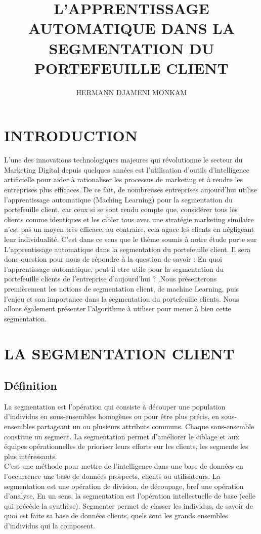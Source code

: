 \documentclass{article}
\title{L'APPRENTISSAGE AUTOMATIQUE DANS LA SEGMENTATION DU PORTEFEUILLE CLIENT}
\author{HERMANN DJAMENI MONKAM}
\begin{document}
\maketitle{} 
\tableofcontents 
\section{INTRODUCTION}
L'une des innovations technologiques majeures qui révolutionne le secteur du Marketing Digital depuis quelques années est l'utilisation d'outils d'intelligence artificielle pour aider à rationaliser les processus de marketing et à rendre les entreprises plus efficaces. De ce fait, de nombreuses entreprises aujourd’hui utilise l’apprentissage automatique (Maching Learning) pour la segmentation du portefeuille client, car ceux si se sont rendu compte que, considérer tous les clients comme identiques et les cibler tous avec une stratégie marketing similaire n'est pas un moyen très efficace, au contraire, cela agace les clients en négligeant leur individualité. C’est dans ce sens que le thème soumis à notre étude porte sur L’apprentissage automatique dans la segmentation du portefeuille client. Il sera donc question pour nous de répondre à la question de savoir : En quoi l’apprentissage automatique, peut-il etre utile pour la segmentation du portefeuille clients de l’entreprise d’aujourd’hui ? .Nous présenterons premièrement les notions de segmentation client, de machine Learning, puis l’enjeu et  son importance dans la segmentation du portefeuille clients. Nous allons également présenter l’algorithme à utiliser pour mener à bien cette segmentation.

\section{LA SEGMENTATION CLIENT}
\subsection{Définition}	
La segmentation est l’opération qui consiste à découper une population d’individus en sous-ensembles homogènes ou pour être plus précis, en sous-ensembles partageant un ou plusieurs attributs communs. Chaque sous-ensemble constitue un segment.  La segmentation permet d’améliorer le ciblage et aux équipes opérationnelles de prioriser leurs efforts sur les clients, les segments les plus intéressants.
\\C’est une méthode pour mettre de l’intelligence dans une base de données en l’occurrence une base de données prospects, clients ou utilisateurs. La segmentation est une opération de division, de découpage, bref une opération d’analyse. En un sens, la segmentation est l’opération intellectuelle de base (celle qui précède la synthèse). Segmenter permet de classer les individus, de savoir de quoi est faite sa base de données clients, quels sont les grands ensembles d’individus qui la composent. 
\end{document}
